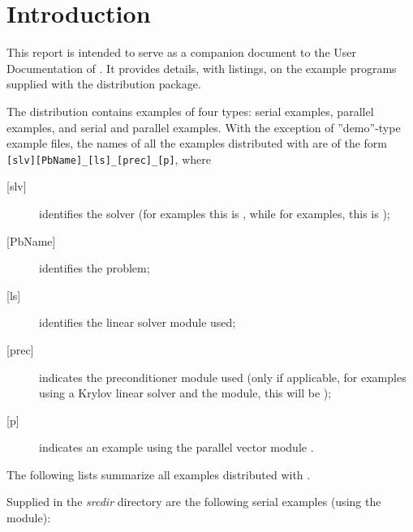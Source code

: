 \section{Introduction}\label{s:ex_intro}

This report is intended to serve as a companion document to the User
Documentation of {\kinsol} \cite{kinsol_ug}.  It provides details, with
listings, on the example programs supplied with the {\kinsol} distribution
package.

The {\kinsol} distribution contains examples of four types: serial
{\C} examples, parallel {\C} examples, and serial and parallel {\F}
examples.
With the exception of ''demo''-type example files, the names of all the examples 
distributed with {\sundials} are of the form \verb![slv][PbName]_[ls]_[prec]_[p]!, 
where
\begin{description}
\item [{[slv]}] identifies the solver (for {\kinsol} examples this is , 
  while for {\fkinsol} examples, this is );
\item [{[PbName]}] identifies the problem;
\item [{[ls]}] identifies the linear solver module used;
\item [{[prec]}] indicates the {\kinsol} preconditioner module used
  (only if applicable, for examples using a Krylov linear solver
  and the {\kinbbdpre} module, this will be );
\item [{[p]}] indicates an example using the parallel vector module {\nvecp}.
\end{description}

\vspace{0.2in}\noindent
The following lists summarize all examples distributed with {\kinsol}.

\vspace{0.2in}\noindent
Supplied in the {\em srcdir} directory are the
following serial examples (using the {\nvecs} module):

